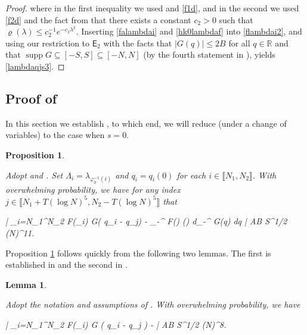 \documentclass{amsart}
\numberwithin{equation}{section}
\DeclareMathOperator{\supp}{supp}
\newtheorem{prop}[thm]{Proposition}
\newtheorem{lem}[thm]{Lemma}
\theoremstyle{remark}
\theoremstyle{definition}
\begin{document}
\begin{proof}
		\noindent where in the first inequality we used  and \eqref{f1d}, and in the second we used \eqref{f2d} and the fact from  that there exists a constant $c_2 > 0$ such that $\varrho (\lambda) \le c_2^{-1} e^{-c_2 \lambda^2}$. Inserting \eqref{falambdai} and \eqref{hk0lambdaf} into \eqref{flambdai2}, and using our restriction to $\mathsf{E}_2$ with the facts that $| G(q) | \le 2B$ for all $q \in \mathbb{R}$ and that $\supp G \subseteq [-S, S] \subseteq [-N, N]$ (by the fourth statement in ), yields \eqref{lambdaqjs3}.
	\end{proof} 
	
	
	
	\subsection{Proof of } 
	
	\label{ProofHs0} 
	
	In this section we establish , to which end, we will reduce (under a change of variables) to the case when $s=0$.
	
	\begin{prop}
		
		\label{concentrationhs0} 
		
		Adopt  and . Set $\Lambda_{i} = \lambda_{\varphi_0^{-1} (i)}$ and $q_i = q_i (0)$ for each $i \in \llbracket N_1, N_2 \rrbracket$. With overwhelming probability, we have for any index $j \in \llbracket N_1 + T (\log N)^5,  N_2 - T (\log N)^5 \rrbracket$ that  
		\begin{flalign*}
			\Bigg| \displaystyle\sum_{i=N_1}^{N_2} F(\Lambda_i) \cdot G( q_i - q_j)  - \displaystyle\int_{-\infty}^{\infty} F(\lambda) \varrho(\lambda) d\lambda \displaystyle\int_{-\infty}^{\infty} G(\alpha q) dq \Bigg|  AB S^{1/2} (\log N)^{11}.
		\end{flalign*}
		
		
	\end{prop} 
	
	Proposition \ref{concentrationhs0} follows quickly from the following two lemmas. The first is established in  and the second in \Cref{ProofH}.
	
	\begin{lem}
		
		\label{concentrationh2} 
		
		Adopt the notation and assumptions of . With overwhelming probability, we have 
		\begin{flalign*}
			\Bigg| \displaystyle\sum_{i=N_1}^{N_2} F(\Lambda_{i}) \cdot G ( q_i - q_j  ) -  \bigg[ \displaystyle\sum_{i=N_1}^{N_2} F(\Lambda_{i}) \cdot G ( q_i  - q_j ) \bigg] \Bigg| \le AB S^{1/2} (\log N)^8.
		\end{flalign*}
		
	\end{lem}
	
\end{document}
